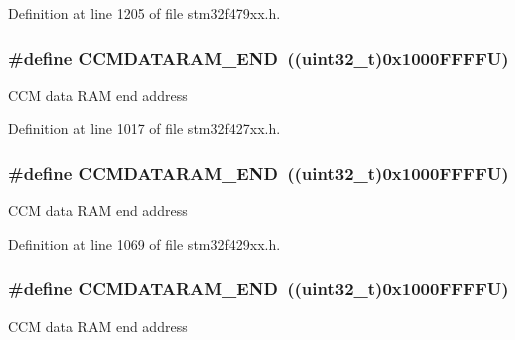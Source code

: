 Definition at line 1205 of file stm32f479xx.\+h.

\subsubsection[{\texorpdfstring{C\+C\+M\+D\+A\+T\+A\+R\+A\+M\+\_\+\+E\+ND}{CCMDATARAM_END}}]{\setlength{\rightskip}{0pt plus 5cm}\#define C\+C\+M\+D\+A\+T\+A\+R\+A\+M\+\_\+\+E\+ND~((uint32\+\_\+t)0x1000\+F\+F\+F\+F\+U)}\hypertarget{group___peripheral__memory__map_ga9fbe263946209e6f09faf93512bd2f9a}{}\label{group___peripheral__memory__map_ga9fbe263946209e6f09faf93512bd2f9a}
C\+CM data R\+AM end address 

Definition at line 1017 of file stm32f427xx.\+h.

\subsubsection[{\texorpdfstring{C\+C\+M\+D\+A\+T\+A\+R\+A\+M\+\_\+\+E\+ND}{CCMDATARAM_END}}]{\setlength{\rightskip}{0pt plus 5cm}\#define C\+C\+M\+D\+A\+T\+A\+R\+A\+M\+\_\+\+E\+ND~((uint32\+\_\+t)0x1000\+F\+F\+F\+F\+U)}\hypertarget{group___peripheral__memory__map_ga9fbe263946209e6f09faf93512bd2f9a}{}\label{group___peripheral__memory__map_ga9fbe263946209e6f09faf93512bd2f9a}
C\+CM data R\+AM end address 

Definition at line 1069 of file stm32f429xx.\+h.

\subsubsection[{\texorpdfstring{C\+C\+M\+D\+A\+T\+A\+R\+A\+M\+\_\+\+E\+ND}{CCMDATARAM_END}}]{\setlength{\rightskip}{0pt plus 5cm}\#define C\+C\+M\+D\+A\+T\+A\+R\+A\+M\+\_\+\+E\+ND~((uint32\+\_\+t)0x1000\+F\+F\+F\+F\+U)}\hypertarget{group___peripheral__memory__map_ga9fbe263946209e6f09faf93512bd2f9a}{}\label{group___peripheral__memory__map_ga9fbe263946209e6f09faf93512bd2f9a}
C\+CM data R\+AM end address 

